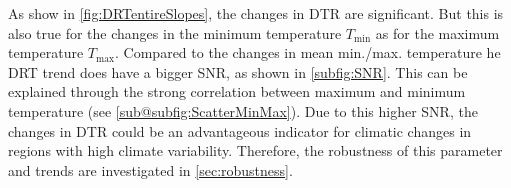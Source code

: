 As show in \cref{fig:DRTentireSlopes}, the changes in DTR are significant. But this is also true for the changes in the minimum temperature $T_{\mathrm{min}}$ as for the maximum temperature $T_{\mathrm{max}}$.
Compared to the changes in mean min./max. temperature he DRT trend does have a bigger SNR, as shown in \cref{subfig:SNR}. This can be explained through the strong correlation between maximum and 
minimum temperature (see \cref{sub@subfig:ScatterMinMax}). Due to this higher SNR, the changes in DTR could be an advantageous indicator for climatic changes in regions with high 
climate variability. Therefore, the robustness of this parameter and trends are investigated in \cref{sec:robustness}.

